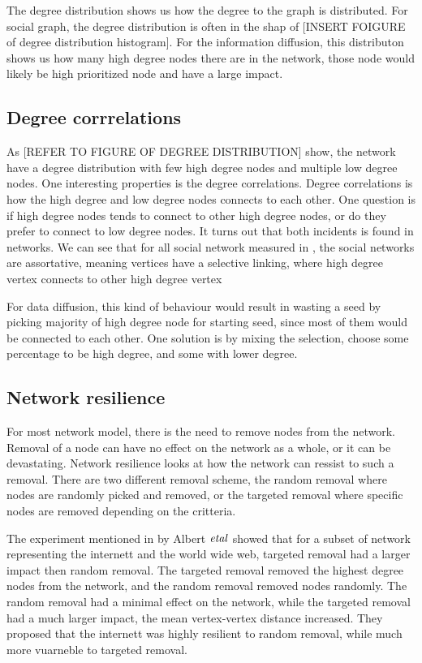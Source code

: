 The degree distribution shows us how the degree to the graph is distributed. For social graph, the degree distribution is often in the shap of [INSERT FOIGURE of degree distribution histogram]. For the information diffusion, this distributon shows us how many high degree nodes there are in the network, those node would likely be high prioritized node and have a large impact. 

\subsection{Degree corrrelations}
As [REFER TO FIGURE OF DEGREE DISTRIBUTION] show, the network have a degree distribution with few high degree nodes and multiple low degree nodes. One interesting properties is the degree correlations. Degree correlations is how the high degree and low degree nodes connects to each other. One question is if high degree nodes tends to connect to other high degree nodes, or do they prefer to connect to low degree nodes. It turns out that both incidents is found in networks\cite{complexNetwork}. We can see that for all social network measured in \cite{complexNetwork}, the social networks are assortative, meaning vertices have a selective linking, where high degree vertex connects to other high degree vertex\cite{AssortativeMixing2002} 

For data diffusion, this kind of behaviour would result in wasting a seed by picking majority of high degree node for starting seed, since most of them would be connected to each other. One solution is by mixing the selection, choose some percentage to be high degree, and some with lower degree.


\subsection{Network resilience}
For most network model, there is the need to remove nodes from the network. Removal of a node can have no effect on the network as a whole, or it can be devastating. Network resilience looks at how the network can ressist to such a removal. There are two different removal scheme, the random removal where nodes are randomly picked and removed, or the targeted removal where specific nodes are removed depending on the critteria. 

The experiment mentioned in \cite{complexNetwork} by Albert $\it{et al}$ showed that for a subset of network representing the internett and the world wide web, targeted removal had a larger impact then random removal. The targeted removal removed the highest degree nodes from the network, and the random removal removed nodes randomly. The random removal had a minimal effect on the network, while the targeted removal had a much larger impact, the mean vertex-vertex distance increased. They proposed that the internett was highly resilient to random removal, while much more vuarneble to targeted removal. 

